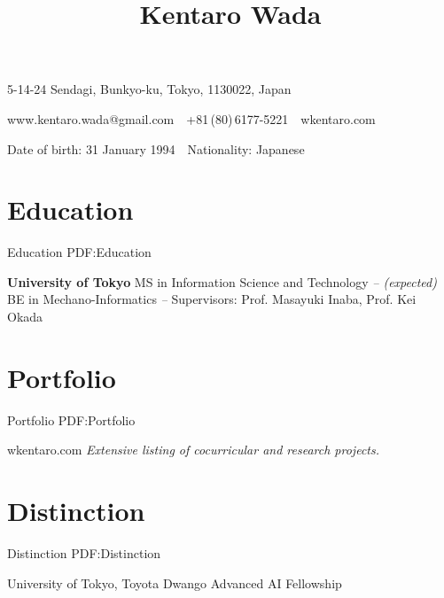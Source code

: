 \documentclass[letterpaper,MMMyyyy,nonstop]{simpleresumecv}
\newcommand{\CVAuthor}{Kentaro Wada}
\newcommand{\CVWebpage}{wkentaro.com}
\begin{document}

\title{\CVAuthor}

\begin{subtitle}
5-14-24 Sendagi, Bunkyo-ku, Tokyo, 1130022, Japan
\par
www.kentaro.wada@gmail.com
\,\SubBulletSymbol\,
+81\,(80)\,6177-5221
\,\SubBulletSymbol\,
\CVWebpage
\par
Date of birth: 31 January 1994
\,\SubBulletSymbol\,
Nationality: Japanese

\noindent\makebox[\linewidth]{\rule{0.8\paperwidth}{0.4pt}}
\end{subtitle}

\begin{body}


\section
{Education}
{Education}
{PDF:Education}

\textbf{University of Tokyo}
\newline
MS in Information Science and Technology
\hfill
{\it {} --  (expected)}
\newline
BE in Mechano-Informatics
\hfill
{\it {} -- }
\newline
Supervisors: Prof. Masayuki Inaba, Prof. Kei Okada


\section
{Portfolio}
{Portfolio}
{PDF:Portfolio}

\CVWebpage
\newline
{\it Extensive listing of cocurricular and research projects.}


\section
{Distinction}
{Distinction}
{PDF:Distinction}

University of Tokyo, Toyota Dwango Advanced AI Fellowship
\hfill
{\it {}}


\end{body}
\end{document}
